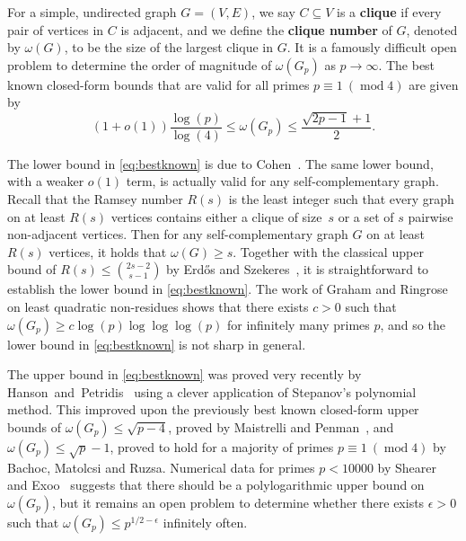 \documentclass[]{spie}  %
\begin{document}
For a simple, undirected graph $G = (V,E)$, we say $C \subseteq V$ is a \textbf{clique} if every pair of vertices in $C$ is adjacent, and we define the \textbf{clique number} of $G$, denoted by $\omega(G)$, to be the size of the largest clique in $G$.  It is a famously difficult open problem to determine the order of magnitude of $\omega(G_p)$ as $p \rightarrow \infty$.  The best known closed-form bounds that are valid for all primes $p \equiv 1~(\operatorname{mod}4)$ are given by
\begin{equation}\label{eq:bestknown}
(1 + o(1)) \frac{\log(p)}{\log(4)} \leq \omega(G_p) \leq \frac{\sqrt{2p - 1} + 1}{2}.
\end{equation}

%

The lower bound in \eqref{eq:bestknown} is due to Cohen~\cite{cohen88}.  The same lower bound, with a weaker $o(1)$ term, is actually valid for any self-complementary graph.  Recall that the Ramsey number $R(s)$ is the least integer such that every graph on at least $R(s)$ vertices contains either a clique of size~$s$ or a set of $s$ pairwise non-adjacent vertices.  Then for any self-complementary graph $G$ on at least $R(s)$ vertices, it holds that $\omega(G) \geq s$.  Together with the classical upper bound of $R(s) \leq \binom{2s - 2}{s - 1}$ by Erd\H{o}s and Szekeres~\cite{erdos35}, it is straightforward to establish the lower bound in \eqref{eq:bestknown}.  The work of Graham and Ringrose~\cite{graham90} on least quadratic non-residues shows that there exists $c > 0$ such that $\omega(G_p) \geq c\log(p)\log\log\log(p)$ for infinitely many primes $p$, and so the lower bound in \eqref{eq:bestknown} is not sharp in general.

The upper bound in \eqref{eq:bestknown} was proved very recently by Hanson~and~Petridis~\cite{hanson19} using a clever application of Stepanov's polynomial method.  This improved upon the previously best known closed-form upper bounds of $\omega(G_p) \leq \sqrt{p - 4}$, proved by Maistrelli and Penman~\cite{maistrelli06}, and $\omega(G_p) \leq \sqrt{p} - 1$, proved to hold for a majority of primes $p \equiv 1~(\operatorname{mod}4)$ by Bachoc, Matolcsi and Ruzsa\cite{bachoc13}.  Numerical data for primes $p < 10000$ by Shearer~\cite{shearer86} and Exoo~\cite{exooData} suggests that there should be a polylogarithmic upper bound on $\omega(G_p)$, but it remains an open problem to determine whether there exists $\epsilon > 0$ such that $\omega(G_p) \leq p^{1/2 - \epsilon}$ infinitely often.
\end{document}
